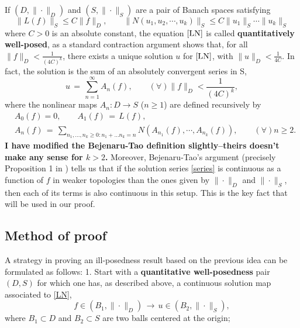 \documentclass{amsart}
\begin{document}
If  $(D,\|\cdot \|_D)$ and $(S,\|\cdot \|_S)$ are a pair of Banach spaces satisfying 
\begin{equation}
\|L(f)\|_S \leq C \|f\|_D,\qquad \|N(u_{1}, u_{2}, \cdots, u_{k})\|_S \leq C \| u_{1} \|_{S}\cdots\| u_{k} \|_{S} 
\label{estim}
\end{equation}
where $C>0$ is an absolute constant, the equation $\eqref{LN}$ is called \textbf{quantitatively well-posed}, as a standard contraction argument shows that, for all  $\|f\|_D<\frac{1}{(4C)^{k}}$, there exists a unique solution $u$ for $\eqref{LN}$, with $\|u\|_D<\frac{1}{4C}$. In fact, the solution is the sum of an absolutely convergent series in S, 
\begin{equation}
u\,=\,\sum_{n=1}^{\infty} A_n(f), \qquad (\forall) \|f\|_D<\frac{1}{(4C)^k},
\label{series}
\end{equation}
where the nonlinear maps $A_n: D\to S$ ($n\geq 1$) are defined recursively by
\begin{equation}
  \begin{split}
& A_{0}(f)=0, \qquad 
  A_1(f)\,=\,L(f), \qquad 
  \\
  & A_n(f)\,=\,\sum_{n_{1}, \ldots, n_{k} \ge 0: n_{1} + \ldots n_{k} = n} N(A_{n_1}(f),\cdots, A_{n_{k}}(f)), \qquad (\forall)n\geq 2.
\label{An}
\end{split}
\end{equation}
\textbf{I have modified the Bejenaru-Tao definition slightly--theirs doesn't make any sense for $k >2$.}
Moreover, Bejenaru-Tao's argument (precisely Proposition 1 in \cite{BT06}) tells us that if the solution series \eqref{series} is continuous as a function of $f$ in  weaker topologies than the ones given by $\| \cdot\|_D$ and $\| \cdot \|_S$, then each of its terms is also continuous in this setup. This is the key fact  that will be used in our proof.
\subsection{Method of proof} A strategy in proving an ill-posedness result based on the previous idea can be formulated as follows:
1. Start with a \textbf{quantitative well-posedness} pair $(D,S)$ for which one has, as described above, a continuous solution map associated to \eqref{LN},
\begin{equation}
f\in (B_1,\|\cdot \|_D)\,\longrightarrow\,u\in (B_2,\|\cdot \|_S),
\end{equation} 
where $B_1\subset D$ and $B_2 \subset S$ are two balls centered at the origin;
\end{document}
